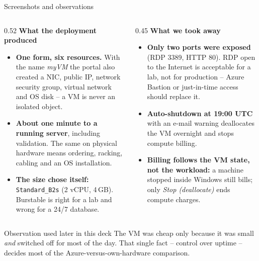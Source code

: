 \documentclass[aspectratio=169,xcolor=dvipsnames]{beamer}
\begin{document}
	\begin{frame}[shrink=5]{Screenshots and observations}
		\begin{columns}[T]
			\begin{column}{0.52\textwidth}
				\textbf{\large What the deployment produced}
				\begin{itemize}
					\item \textbf{One form, six resources.} With the name \textit{myVM} the portal also created a NIC, public IP, network security group, virtual network and OS disk -- a VM is never an isolated object.
					\item \textbf{About one minute to a running server}, including validation. The same on physical hardware means ordering, racking, cabling and an OS installation.
					\item \textbf{The size chose itself:} \texttt{Standard\_B2s} (2 vCPU, 4\,GB). Burstable is right for a lab and wrong for a 24/7 database.
				\end{itemize}
			\end{column}
			
			\begin{column}{0.45\textwidth}
				\textbf{\large What we took away}
				\begin{itemize}
					\item \textbf{Only two ports were exposed} (RDP 3389, HTTP 80). RDP open to the Internet is acceptable for a lab, not for production -- Azure Bastion or just-in-time access should replace it.
					\item \textbf{Auto-shutdown at 19:00 UTC} with an e-mail warning deallocates the VM overnight and stops compute billing.
					\item \textbf{Billing follows the VM state, not the workload:} a machine stopped inside Windows still bills; only \textit{Stop (deallocate)} ends compute charges.
				\end{itemize}
			\end{column}
		\end{columns}
		
		\vspace{0.25cm}
		\begin{block}{Observation used later in this deck}
			The VM was cheap only because it was small \emph{and} switched off for most of the day. That single fact -- control over uptime -- decides most of the Azure-versus-own-hardware comparison.
		\end{block}
	\end{frame}
\end{document}

